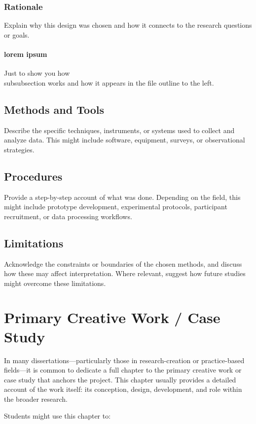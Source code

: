 \documentclass[12pt]{yorkudiss}
\begin{document}
\subsection{Rationale}
Explain why this design was chosen and how it connects to the research questions or goals. 

\subsubsection{lorem ipsum}
Just to show you how \\subsubsection{} works and how it appears in the file outline to the left. 

\section{Methods and Tools}
Describe the specific techniques, instruments, or systems used to collect and analyze data. This might include software, equipment, surveys, or observational strategies.  

\section{Procedures}
Provide a step-by-step account of what was done. Depending on the field, this might include prototype development, experimental protocols, participant recruitment, or data processing workflows.  

\section{Limitations}
Acknowledge the constraints or boundaries of the chosen methods, and discuss how these may affect interpretation. Where relevant, suggest how future studies might overcome these limitations.  




\chapter{Primary Creative Work / Case Study}

In many dissertations—particularly those in research-creation or practice-based fields—it is common to dedicate a full chapter to the primary creative work or case study that anchors the project. This chapter usually provides a detailed account of the work itself: its conception, design, development, and role within the broader research.  

Students might use this chapter to:  
\end{document}
